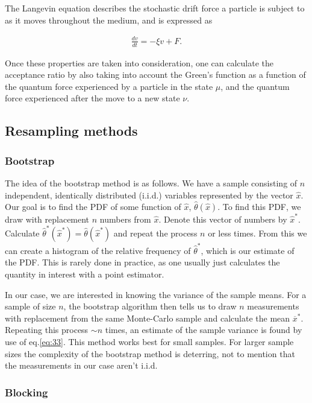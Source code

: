 \documentclass[
    a4paper, aps, twocolumn, floatfix, superscriptaddress,
    nofootinbib]{revtex4-1}
\begin{document}
The Langevin equation describes the stochastic drift force a particle is subject to as it moves throughout the medium, and is expressed as

\begin{align}
    \frac{dv}{dt} = -\xi v + F. \label{eq:Langevin}
\end{align}

Once these properties are taken into consideration, one can calculate the acceptance ratio by also taking into account the Green's function as a function of the quantum force experienced by a particle in the state $\mu$, and the quantum force experienced after the move to a new state $\nu$.

\subsection{Resampling methods}
\subsubsection{Bootstrap}\label{subsubsec:bootstrap}
The idea of the bootstrap method is as follows. We have a sample consisting of $n$ independent, identically distributed (i.i.d.) variables represented by the vector $\hat{x}$. Our goal is to find the PDF of some function of $\hat{x}$,  $\hat{\theta}(\hat{x})$. To find this PDF, we draw with replacement $n$ numbers from $\hat{x}$. Denote this vector of numbers by $\hat{x}^{\ast}$. Calculate $\hat\theta^{\ast}(\hat{x}^{\ast}) =\hat\theta(\hat{x}^{\ast})$ and repeat the process $n$ or less times. From this we can create a histogram of the relative frequency of $\hat\theta^{\ast}$, which is our estimate of the PDF. This is rarely done in practice, as one usually just calculates the quantity in interest with a point estimator.

In our case, we are interested in knowing the variance of the sample means. For a sample of size $n$, the bootstrap algorithm then tells us to draw  $n$ measurements with replacement from the same Monte-Carlo sample and calculate the mean $\overline{x}^{\ast}$. Repeating this process $\sim n$ times, an estimate of the sample variance is found by use of eq.\eqref{eq:33}. This method works best for small samples. For larger sample sizes the complexity of the bootstrap method is deterring, not to mention that the measurements in our case aren't i.i.d.
\subsubsection{Blocking}\label{subsubsec:blocking}
\end{document}
